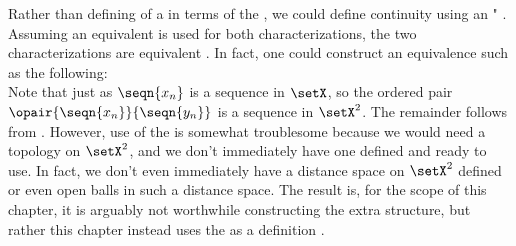 \begin{remark}
Rather than defining  of a  in terms of 
the  ,
we could define continuity using an " .
Assuming an equivalent  is used for both characterizations, the 
two characterizations are equivalent .
In fact, one could construct an equivalence such as the following:
\\
Note that just as $\seqn{x_n}$ is a sequence in $\setX$, so the ordered pair $\opair{\seqn{x_n}}{\seqn{y_n}}$
is a sequence in $\setX^2$.
The remainder %
follows from .
However, use of the  is somewhat troublesome
because we would need a topology on $\setX^2$, and we don't immediately have one defined and ready to use.
In fact, we don't even immediately have a distance space on $\setX^2$ defined or even open balls in such a distance space.
The result is, for the scope of this chapter, it is arguably not worthwhile constructing the extra structure, 
but rather this chapter instead
uses the  as a definition .
\end{remark}

